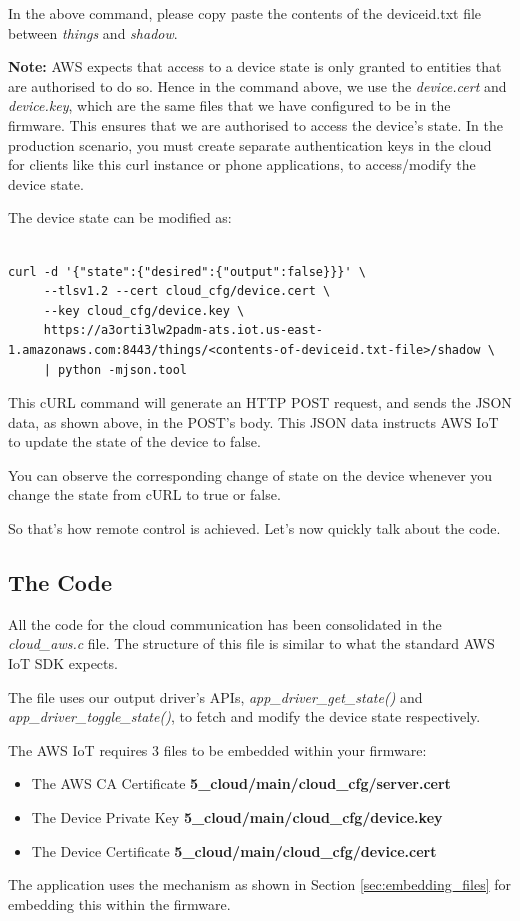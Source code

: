 \documentclass[main.tex]{subfiles}
\begin{document}
In the above command, please copy paste the contents of the deviceid.txt file between \textit{things} and \textit{shadow}.

\textbf{Note:} AWS expects that access to a device state is only granted to entities that are authorised to do so. Hence in the command above, we use the \textit{device.cert} and \textit{device.key}, which are the same files that we have configured to be in the firmware. This ensures that we are authorised to access the device's state. In the production scenario, you must create separate authentication keys in the cloud for clients like this curl instance or phone applications, to access/modify the device state.

The device state can be modified as:
\begin{verbatim}

curl -d '{"state":{"desired":{"output":false}}}' \ 
     --tlsv1.2 --cert cloud_cfg/device.cert \ 
     --key cloud_cfg/device.key \ 
     https://a3orti3lw2padm-ats.iot.us-east-1.amazonaws.com:8443/things/<contents-of-deviceid.txt-file>/shadow \
     | python -mjson.tool
\end{verbatim}

This cURL command will generate an HTTP POST request, and sends the JSON data, as shown above, in the POST's body. This JSON data instructs AWS IoT to update the state of the device to false.

You can observe the corresponding change of state on the device whenever you change the state from cURL to true or false.

So that's how remote control is achieved. Let's now quickly talk about the code.

\subsection{The Code}\index{The Code}
All the code for the cloud communication has been consolidated in the \textit{cloud\_aws.c} file. The structure of this file is similar to what the standard AWS IoT SDK expects.

The file uses our output driver's APIs, \textit{app\_driver\_get\_state()} and \textit{app\_driver\_toggle\_state()}, to fetch and modify the device state respectively.

The AWS IoT requires 3 files to be embedded within your firmware:
\begin{itemize}
        \item The AWS CA Certificate  \textbf{5\_cloud/main/cloud\_cfg/server.cert}
        \item The Device Private Key  \textbf{5\_cloud/main/cloud\_cfg/device.key}
        \item The Device Certificate  \textbf{5\_cloud/main/cloud\_cfg/device.cert}
\end{itemize}
The application uses the mechanism as shown in Section \ref{sec:embedding_files} for embedding this within the firmware.
\end{document}
